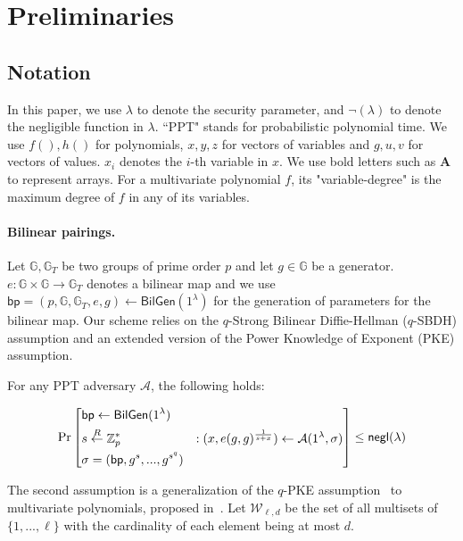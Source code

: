 \section{Preliminaries}
\label{sec::prelim}

\subsection{Notation}

In this paper, we use $\lambda$ to denote the security parameter, and $\neg(\lambda)$ to denote the negligible function in $\lambda$. ``PPT" stands for probabilistic polynomial time. We use $f(),h()$ for polynomials, $x,y,z$ for vectors of variables and $g,u,v$ for vectors of values. $x_i$ denotes the $i$-th variable in $x$. We use bold letters such as $\textbf{A}$ to represent arrays. For a multivariate polynomial $f$, its "variable-degree" is the maximum degree of $f$ in any of its variables.

\paragraph{Bilinear pairings.} Let $\mathbb{G}, \mathbb{G}_T$ be two groups of prime order $p$ and let $g\in\mathbb{G}$ be a generator. $e: \mathbb{G}\times\mathbb{G}\rightarrow\mathbb{G}_T$ denotes a bilinear map and we use $\mathsf{bp}=(p,\mathbb{G},\mathbb{G}_T,e,g)\leftarrow\mathsf{BilGen}(1^\lambda)$ for the generation of parameters for the bilinear map. Our scheme relies on the $q$-Strong Bilinear Diffie-Hellman ($q$-SBDH) assumption and an extended version of the Power Knowledge of Exponent (PKE) assumption. 


\begin{assumption}
	\label{asp::qSDH}
	For any PPT adversary $\mathcal{A}$, the following holds:
	
	\[\Pr\left[ \begin{aligned}
	&\mathsf{bp} \leftarrow \mathsf{BilGen}(1^\lambda) & \\
	&s \overset{R}{\leftarrow} \mathbb{Z}^{*}_{p} & : (x, e(g, g)^{\frac{1}{s+x}}) \leftarrow \mathcal{A}(1^\lambda, \sigma)\\
	&\sigma = (\mathsf{bp}, g^s, ..., g^{s^q})
	\end{aligned} \right] \le {\sf negl}{(\lambda)}\]
\end{assumption}

The second assumption is a generalization of the $q$-PKE assumption~\cite{groth2010short} to multivariate polynomials, proposed in~\cite{zhang2017vsql,zkvpd}. Let $\mathcal {W}_ {\ell,d}$ be the set of all multisets of $\{1, . . . , \ell\}$ with the cardinality of each element being at most $d$. 

